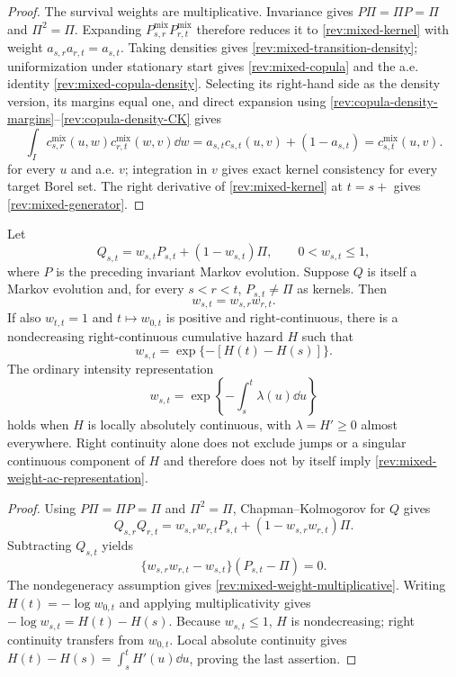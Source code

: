 \begin{proof}
The survival weights are multiplicative.  Invariance gives
$P\Pi=\Pi P=\Pi$ and $\Pi^2=\Pi$.  Expanding
$P^{\mathrm{mix}}_{s,r}P^{\mathrm{mix}}_{r,t}$ therefore reduces it to
\eqref{rev:mixed-kernel} with weight $a_{s,r}a_{r,t}=a_{s,t}$.
Taking densities gives \eqref{rev:mixed-transition-density}; uniformization
under stationary start gives \eqref{rev:mixed-copula} and
the a.e. identity \eqref{rev:mixed-copula-density}.  Selecting its right-hand
side as the density version, its margins equal one, and direct expansion
using \eqref{rev:copula-density-margins}--\eqref{rev:copula-density-CK} gives
\[
\int_Ic^{\mathrm{mix}}_{s,r}(u,w)c^{\mathrm{mix}}_{r,t}(w,v)\dd w
=a_{s,t}c_{s,t}(u,v)+(1-a_{s,t})
=c^{\mathrm{mix}}_{s,t}(u,v).
\]
for every $u$ and a.e. $v$; integration in $v$ gives exact kernel consistency
for every target Borel set.
The right derivative of \eqref{rev:mixed-kernel} at $t=s+$ gives
\eqref{rev:mixed-generator}.
\end{proof}

\begin{proposition}
\label{rev:prop-mixed-weight-necessity}
Let
\[
 Q_{s,t}=w_{s,t}P_{s,t}+(1-w_{s,t})\Pi,
 \qquad 0<w_{s,t}\leq1,
\]
where $P$ is the preceding invariant Markov evolution.  Suppose $Q$ is itself
a Markov evolution and, for every $s<r<t$, $P_{s,t}\ne\Pi$ as kernels.  Then
\begin{equation}
 w_{s,t}=w_{s,r}w_{r,t}.
 \label{rev:mixed-weight-multiplicative}
\end{equation}
If also $w_{t,t}=1$ and $t\mapsto w_{0,t}$ is positive and right-continuous,
there is a nondecreasing right-continuous cumulative hazard $H$ such that
\begin{equation}
 w_{s,t}=\exp\{-[H(t)-H(s)]\}.
 \label{rev:mixed-weight-cumulative-hazard}
\end{equation}
The ordinary intensity representation
\begin{equation}
 w_{s,t}=\exp\!\left\{-\int_s^t\lambda(u)\dd u\right\}
 \label{rev:mixed-weight-ac-representation}
\end{equation}
holds when $H$ is locally absolutely continuous, with
$\lambda=H'\geq0$ almost everywhere.  Right continuity alone does not exclude
jumps or a singular continuous component of $H$ and therefore does not by
itself imply \eqref{rev:mixed-weight-ac-representation}.
\end{proposition}

\begin{proof}
Using $P\Pi=\Pi P=\Pi$ and $\Pi^2=\Pi$, Chapman--Kolmogorov for $Q$ gives
\[
 Q_{s,r}Q_{r,t}=w_{s,r}w_{r,t}P_{s,t}
 +(1-w_{s,r}w_{r,t})\Pi.
\]
Subtracting $Q_{s,t}$ yields
\[
 \{w_{s,r}w_{r,t}-w_{s,t}\}(P_{s,t}-\Pi)=0.
\]
The nondegeneracy assumption gives \eqref{rev:mixed-weight-multiplicative}.
Writing $H(t)=-\log w_{0,t}$ and applying multiplicativity gives
$-\log w_{s,t}=H(t)-H(s)$.  Because $w_{s,t}\leq1$, $H$ is nondecreasing;
right continuity transfers from $w_{0,t}$.  Local absolute continuity gives
$H(t)-H(s)=\int_s^tH'(u)\dd u$, proving the last assertion.
\end{proof}


